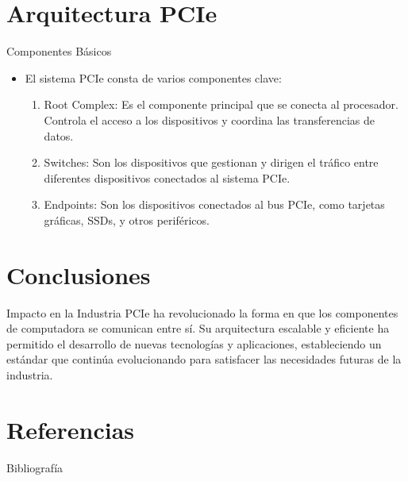 \documentclass[presentation]{beamer}
\begin{document}
\section{Arquitectura PCIe}
\label{sec:orgc1da2bf}
\begin{frame}[label={sec:org4f61a57}]{Componentes Básicos}
\begin{itemize}
\item El sistema PCIe consta de varios componentes clave:
\begin{enumerate}
\item \alert{\alert{Root Complex}}: Es el componente principal que se conecta al procesador. Controla el acceso a los dispositivos y coordina las transferencias de datos.

\item \alert{\alert{Switches}}: Son los dispositivos que gestionan y dirigen el tráfico entre diferentes dispositivos conectados al sistema PCIe.

\item \alert{\alert{Endpoints}}: Son los dispositivos conectados al bus PCIe, como tarjetas gráficas, SSDs, y otros periféricos.
\end{enumerate}
\end{itemize}
\end{frame}

\section{Conclusiones}
\label{sec:org4232492}
\begin{frame}[label={sec:orge014e3d}]{Impacto en la Industria}
PCIe ha revolucionado la forma en que los componentes de computadora se comunican entre sí. Su arquitectura escalable y eficiente ha permitido el desarrollo de nuevas tecnologías y aplicaciones, estableciendo un estándar que continúa evolucionando para satisfacer las necesidades futuras de la industria.
\end{frame}


\section{Referencias}
\label{sec:org1dc2922}
\begin{frame}[allowframebreaks]{Bibliografía}
\printbibliography
\end{frame}
\end{document}
